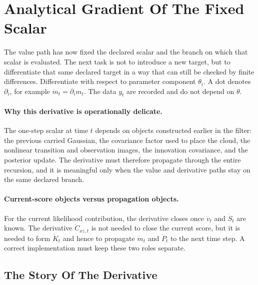 \documentclass[11pt]{article}
\numberwithin{equation}{section}
\begin{document}
\section{Analytical Gradient Of The Fixed Scalar}
\label{sec:p31-gradient}

The value path has now fixed the declared scalar and the branch on which that
scalar is evaluated.  The next task is not to introduce a new target, but to
differentiate that same declared target in a way that can still be checked by
finite differences.  Differentiate with respect to parameter component \(\theta_i\).
A dot denotes \(\partial_i\), for example \(\dot m_t=\partial_i m_t\).  The data
\(y_t\) are recorded and do not depend on \(\theta\).

\paragraph{Why this derivative is operationally delicate.}
The one-step scalar at time \(t\) depends on objects constructed earlier in the
filter: the previous carried Gaussian, the covariance factor used to place the
cloud, the nonlinear transition and observation images, the innovation
covariance, and the posterior update.  The derivative must therefore propagate
through the entire recursion, and it is meaningful only when the value and
derivative paths stay on the same declared branch.

\paragraph{Current-score objects versus propagation objects.}
For the current likelihood contribution, the derivative closes once
\(\dot v_t\) and \(\dot S_t\) are known.  The derivative
\(\dot C_{xz,t}\) is not needed to close the current score, but it is needed to
form \(\dot K_t\) and hence to propagate \(\dot m_t\) and \(\dot P_t\) to the next
time step.  A correct implementation must keep these two roles separate.

\subsection{The Story Of The Derivative}
\label{subsec:p32-gradient-story}
\end{document}
